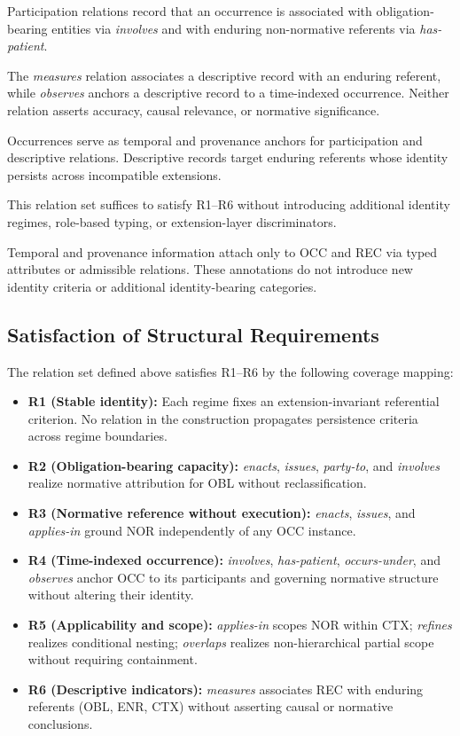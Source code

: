 Participation relations record that an occurrence
is associated with obligation-bearing entities via \emph{involves}
and with enduring non-normative referents via \emph{has-patient}.

The \emph{measures} relation associates a descriptive record
with an enduring referent,
while \emph{observes} anchors a descriptive record
to a time-indexed occurrence.
Neither relation asserts accuracy, causal relevance,
or normative significance.

Occurrences serve as temporal and provenance anchors
for participation and descriptive relations.
Descriptive records target enduring referents whose identity
persists across incompatible extensions.

This relation set suffices to satisfy R1--R6
without introducing additional identity regimes,
role-based typing, or extension-layer discriminators.

Temporal and provenance information attach only to OCC and REC
via typed attributes or admissible relations.
These annotations do not introduce new identity criteria
or additional identity-bearing categories.

\subsection{Satisfaction of Structural Requirements}
\label{sec:requirements_verification}

The relation set defined above satisfies R1--R6 by the
following coverage mapping:

\begin{itemize}
  \item \textbf{R1 (Stable identity):}
        Each regime fixes an extension-invariant
        referential criterion.
        No relation in the construction propagates
        persistence criteria across regime boundaries.
  \item \textbf{R2 (Obligation-bearing capacity):}
        \textit{enacts}, \textit{issues}, \textit{party-to},
        and \textit{involves} realize normative attribution
        for OBL without reclassification.
  \item \textbf{R3 (Normative reference without execution):}
        \textit{enacts}, \textit{issues}, and \textit{applies-in}
        ground NOR independently of any OCC instance.
  \item \textbf{R4 (Time-indexed occurrence):}
        \textit{involves}, \textit{has-patient}, \textit{occurs-under},
        and \textit{observes} anchor OCC to its participants
        and governing normative structure
        without altering their identity.
  \item \textbf{R5 (Applicability and scope):}
        \textit{applies-in} scopes NOR within CTX;
        \textit{refines} realizes conditional nesting;
        \textit{overlaps} realizes non-hierarchical
        partial scope without requiring containment.
  \item \textbf{R6 (Descriptive indicators):}
        \textit{measures} associates REC with enduring
        referents (OBL, ENR, CTX) without asserting
        causal or normative conclusions.
\end{itemize}

